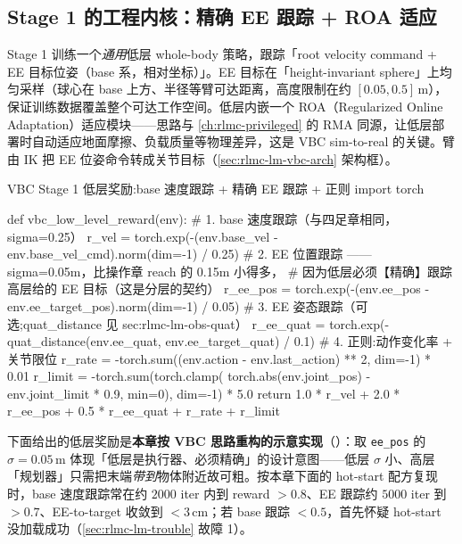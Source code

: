 \subsection{Stage 1 的工程内核：精确 EE 跟踪 + ROA 适应}
\label{sec:rlmc-lm-vbc-stage1}

Stage 1 训练一个\emph{通用}低层 whole-body 策略，跟踪「root velocity command + EE 目标位姿（base 系，相对坐标）」。EE 目标在「height-invariant sphere」上均匀采样（球心在 base 上方、半径等臂可达距离，高度限制在约 $[0.05,0.5]\,$m），保证训练数据覆盖整个可达工作空间。低层内嵌一个 ROA（Regularized Online Adaptation）适应模块——思路与 \cref{ch:rlmc-privileged} 的 RMA 同源，让低层部署时自动适应地面摩擦、负载质量等物理差异，这是 VBC sim-to-real 的关键。臂由 IK 把 EE 位姿命令转成关节目标（\cref{sec:rlmc-lm-vbc-arch} 架构框）。

\begin{codebox}[Python]{VBC Stage 1 低层奖励:base 速度跟踪 + 精确 EE 跟踪 + 正则}
import torch

def vbc_low_level_reward(env):
    # 1. base 速度跟踪（与四足章相同，sigma=0.25）
    r_vel = torch.exp(-(env.base_vel - env.base_vel_cmd).norm(dim=-1) / 0.25)
    # 2. EE 位置跟踪 —— sigma=0.05m，比操作章 reach 的 0.15m 小得多，
    #    因为低层必须【精确】跟踪高层给的 EE 目标（这是分层的契约）
    r_ee_pos = torch.exp(-(env.ee_pos - env.ee_target_pos).norm(dim=-1) / 0.05)
    # 3. EE 姿态跟踪（可选;quat_distance 见 sec:rlmc-lm-obs-quat）
    r_ee_quat = torch.exp(-quat_distance(env.ee_quat, env.ee_target_quat) / 0.1)
    # 4. 正则:动作变化率 + 关节限位
    r_rate  = -torch.sum((env.action - env.last_action) ** 2, dim=-1) * 0.01
    r_limit = -torch.sum(torch.clamp(
        torch.abs(env.joint_pos) - env.joint_limit * 0.9, min=0), dim=-1) * 5.0
    return 1.0 * r_vel + 2.0 * r_ee_pos + 0.5 * r_ee_quat + r_rate + r_limit
\end{codebox}

下面给出的低层奖励是\textbf{本章按 VBC 思路重构的示意实现}（）：取 \verb|ee_pos| 的 $\sigma=0.05\,$m 体现「低层是执行器、必须精确」的设计意图——低层 $\sigma$ 小、高层「规划器」只需把末端\emph{带到}物体附近故可粗。按本章下面的 hot-start 配方复现时，base 速度跟踪常在约 $2000$ iter 内到 reward $>0.8$、EE 跟踪约 $5000$ iter 到 $>0.7$、EE-to-target 收敛到 $<3\,$cm；若 base 跟踪 $<0.5$，首先怀疑 hot-start 没加载成功（\cref{sec:rlmc-lm-trouble} 故障 1）。

